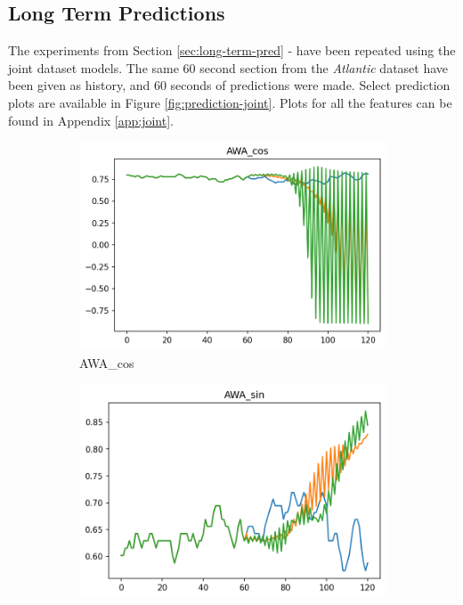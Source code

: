 \documentclass[12pt,twoside]{report}
\begin{document}
\subsection{Long Term Predictions}
The experiments from Section \ref{sec:long-term-pred} -  have been repeated using the joint dataset models.
The same 60 second section from the \textit{Atlantic} dataset have been given as history, and 60 seconds of predictions were made. Select prediction plots are available in Figure \ref{fig:prediction-joint}. Plots for all the features can be found in Appendix \ref{app:joint}.

\begin{figure}[ht]
     \centering
     \begin{subfigure}[b]{0.32\textwidth}
         \centering
         \includegraphics[width=\textwidth]{figures/prediction-plots-joint/AWA_cos.png}
         \caption{AWA\_cos}
     \end{subfigure}
     \begin{subfigure}[b]{0.32\textwidth}
         \centering
         \includegraphics[width=\textwidth]{figures/prediction-plots-joint/AWA_sin.png}

\end{subfigure}
\end{figure}
\end{document}
